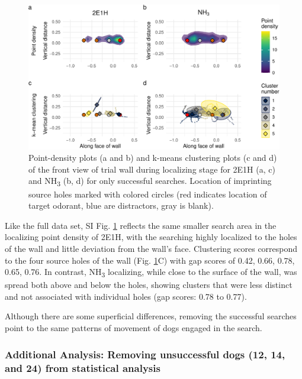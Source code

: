 \documentclass[
]{article}
\begin{document}
\begin{figure}
\centering
\includegraphics{supplementary-info_files/figure-latex/frontwall-detailing-1.pdf}
\caption{\label{fig:frontwall-detailing}Point-density plots (a and b) and k-means clustering plots (c and d) of the front view of trial wall during localizing stage for 2E1H (a, c) and NH\textsubscript{3} (b, d) for only successful searches. Location of imprinting source holes marked with colored circles (red indicates location of target odorant, blue are distractors, gray is blank).}
\end{figure}

Like the full data set, SI Fig. \ref{fig:frontwall-detailing} reflects the same smaller search area in the localizing point density of 2E1H, with the searching highly localized to the holes of the wall and little deviation from the wall's face. Clustering scores correspond to the four source holes of the wall (Fig. \ref{fig:frontwall-detailing}C) with gap scores of 0.42, 0.66, 0.78, 0.65, 0.76. In contrast, NH\textsubscript{3} localizing, while close to the surface of the wall, was spread both above and below the holes, showing clusters that were less distinct and not associated with individual holes (gap scores: 0.78 to 0.77).

Although there are some superficial differences, removing the successful searches point to the same patterns of movement of dogs engaged in the search.

\newpage

\hypertarget{additional-analysis-removing-unsuccessful-dogs-12-14-and-24-from-statistical-analysis}{%
\subsubsection{Additional Analysis: Removing unsuccessful dogs (12, 14, and 24) from statistical analysis}\label{additional-analysis-removing-unsuccessful-dogs-12-14-and-24-from-statistical-analysis}}
\end{document}
